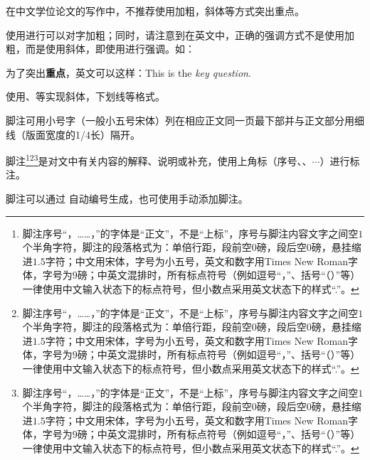 
在中文学位论文的写作中，不推荐使用加粗，斜体等方式突出重点。

使用进行可以对字加粗；同时，请注意到在英文中，正确的强调方式不是使用加粗，而是使用斜体，即使用进行强调。如：
\begin{texcode}[]{}
  为了突出\textbf{重点}，英文可以这样：This is the \emph{key question}.
\end{texcode}

使用、等实现斜体，下划线等格式。






\begin{tcolorbox}[colback=red!5!white,colframe=red!75!black]
  脚注可用小号字（一般小五号宋体）列在相应正文同一页最下部并与正文部分用细线（版面宽度的1/4长）隔开。
\end{tcolorbox}

脚注\footnote{脚注序号“，……，”的字体是“正文”，不是“上标”，序号与脚注内容文字之间空$1$个半角字符，脚注的段落格式为：单倍行距，段前空$0$磅，段后空$0$磅，悬挂缩进$1.5$字符；中文用宋体，字号为小五号，英文和数字用Times New Roman字体，字号为$9$磅；中英文混排时，所有标点符号（例如逗号“，”、括号“（）”等）一律使用中文输入状态下的标点符号，但小数点采用英文状态下的样式“.”。}\footnote{脚注序号“，……，”的字体是“正文”，不是“上标”，序号与脚注内容文字之间空$1$个半角字符，脚注的段落格式为：单倍行距，段前空$0$磅，段后空$0$磅，悬挂缩进$1.5$字符；中文用宋体，字号为小五号，英文和数字用Times New Roman字体，字号为$9$磅；中英文混排时，所有标点符号（例如逗号“，”、括号“（）”等）一律使用中文输入状态下的标点符号，但小数点采用英文状态下的样式“.”。}\footnote{脚注序号“，……，”的字体是“正文”，不是“上标”，序号与脚注内容文字之间空$1$个半角字符，脚注的段落格式为：单倍行距，段前空$0$磅，段后空$0$磅，悬挂缩进$1.5$字符；中文用宋体，字号为小五号，英文和数字用Times New Roman字体，字号为$9$磅；中英文混排时，所有标点符号（例如逗号“，”、括号“（）”等）一律使用中文输入状态下的标点符号，但小数点采用英文状态下的样式“.”。}是对文中有关内容的解释、说明或补充，使用上角标（序号、、$\cdots$）进行标注。

脚注可以通过 \clist{\footnote{}}自动编号生成，也可使用手动添加脚注。

